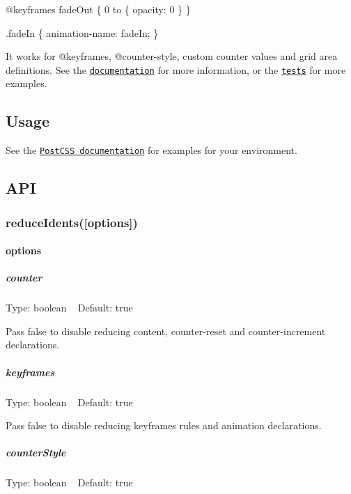 \begin{DoxyCode}
@keyframes fadeOut \{
    0%
    to \{ opacity: 0 \}
\}

.fadeIn \{
    animation-name: fadeIn;
\}
\end{DoxyCode}


It works for {\ttfamily @keyframes}, {\ttfamily @counter-\/style}, custom {\ttfamily counter} values and grid area definitions. See the \href{https://developer.mozilla.org/en-US/docs/Web/CSS/custom-ident}{\tt documentation} for more information, or the \href{test.js}{\tt tests} for more examples.

\subsection*{Usage}

See the \href{https://github.com/postcss/postcss#usage}{\tt Post\+C\+SS documentation} for examples for your environment.

\subsection*{A\+PI}

\subsubsection*{reduce\+Idents(\mbox{[}options\mbox{]})}

\paragraph*{options}

\subparagraph*{counter}

Type\+: {\ttfamily boolean} ~\newline
Default\+: {\ttfamily true}

Pass {\ttfamily false} to disable reducing {\ttfamily content}, {\ttfamily counter-\/reset} and {\ttfamily counter-\/increment} declarations.

\subparagraph*{keyframes}

Type\+: {\ttfamily boolean} ~\newline
Default\+: {\ttfamily true}

Pass {\ttfamily false} to disable reducing {\ttfamily keyframes} rules and {\ttfamily animation} declarations.

\subparagraph*{counter\+Style}

Type\+: {\ttfamily boolean} ~\newline
Default\+: {\ttfamily true}

